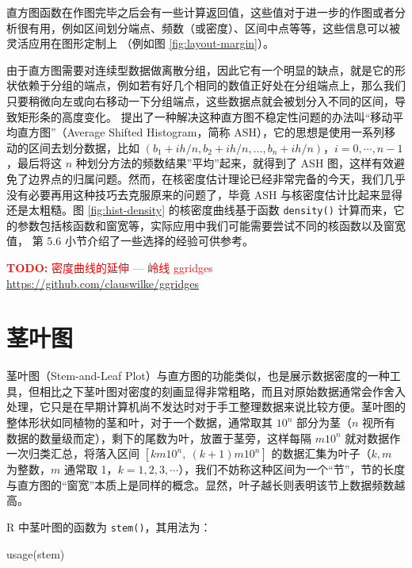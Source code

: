 \documentclass[
  b5paper,
  UTF8,twoside]{book}
\newenvironment{Shaded}{\begin{snugshade}}{\end{snugshade}}
\newcommand{\FunctionTok}[1]{\textcolor[rgb]{0.00,0.00,0.00}{#1}}
\newcommand{\NormalTok}[1]{#1}
\begin{document}
直方图函数在作图完毕之后会有一些计算返回值，这些值对于进一步的作图或者分析很有用，例如区间划分端点、频数（或密度）、区间中点等等，这些信息可以被灵活应用在图形定制上
（例如图 \ref{fig:layout-margin}）。

由于直方图需要对连续型数据做离散分组，因此它有一个明显的缺点，就是它的形状依赖于分组的端点，例如若有好几个相同的数值正好处在分组端点上，那么我们只要稍微向左或向右移动一下分组端点，这些数据点就会被划分入不同的区间，导致矩形条的高度变化。\citet{Scott92} 提出了一种解决这种直方图不稳定性问题的办法叫``移动平均直方图''（Average Shifted Histogram，简称 ASH），它的思想是使用一系列移动的区间去划分数据，比如 \((b_1+ih/n,b_2+ih/n,\ldots,b_n+ih/n)\)，\(i=0,\cdots,n-1\)，最后将这 \(n\) 种划分方法的频数结果''平均''起来，就得到了 ASH 图，这样有效避免了边界点的归属问题。然而，在核密度估计理论已经非常完备的今天，我们几乎没有必要再用这种技巧去克服原来的问题了，毕竟 ASH 与核密度估计比起来显得还是太粗糙。图 \ref{fig:hist-density} 的核密度曲线基于函数 \texttt{density()} 计算而来，它的参数包括核函数和窗宽等，实际应用中我们可能需要尝试不同的核函数以及窗宽值，\citet{Venables02} 第 5.6 小节介绍了一些选择的经验可供参考。

\textcolor{red}{\textbf{TODO: }{密度曲线的延伸 --- 岭线 ggridges \url{https://github.com/clauswilke/ggridges}}}

\hypertarget{ux830eux53f6ux56fe}{%
\section{茎叶图}\label{ux830eux53f6ux56fe}}

茎叶图（Stem-and-Leaf Plot）与直方图的功能类似，也是展示数据密度的一种工具，但相比之下茎叶图对密度的刻画显得非常粗略，而且对原始数据通常会作舍入处理，它只是在早期计算机尚不发达时对于手工整理数据来说比较方便。茎叶图的整体形状如同植物的茎和叶，对于一个数据，通常取其 \(10^n\) 部分为茎（\(n\) 视所有数据的数量级而定），剩下的尾数为叶，放置于茎旁，这样每隔 \(m10^n\) 就对数据作一次归类汇总，将落入区间 \([km10^{n},\ (k+1)m10^{n}]\) 的数据汇集为叶子（\(k,m\) 为整数，\(m\) 通常取 1，\(k=1,2,3,\cdots\)），我们不妨称这种区间为一个``节''，节的长度与直方图的``窗宽''本质上是同样的概念。显然，叶子越长则表明该节上数据频数越高。

R 中茎叶图的函数为 \texttt{stem()}，其用法为：

\begin{Shaded}
\begin{Highlighting}[]
\FunctionTok{usage}\NormalTok{(stem)}
\end{Highlighting}
\end{Shaded}
\end{document}
